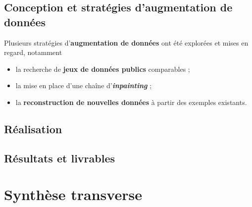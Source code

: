 \subsection{Conception et stratégies d'augmentation de données}
Plusieurs stratégies d'\textbf{augmentation de données} ont été explorées et mises en
regard, notamment
\begin{itemize}
  \item la recherche de \textbf{jeux de données publics} comparables ;
  \item la mise en place d'une chaîne d'\textbf{\emph{inpainting}} ;
  \item la \textbf{reconstruction de nouvelles données} à partir des exemples
        existants.
\end{itemize}

\subsection{Réalisation}

\subsection{Résultats et livrables}

\section{Synthèse transverse}
